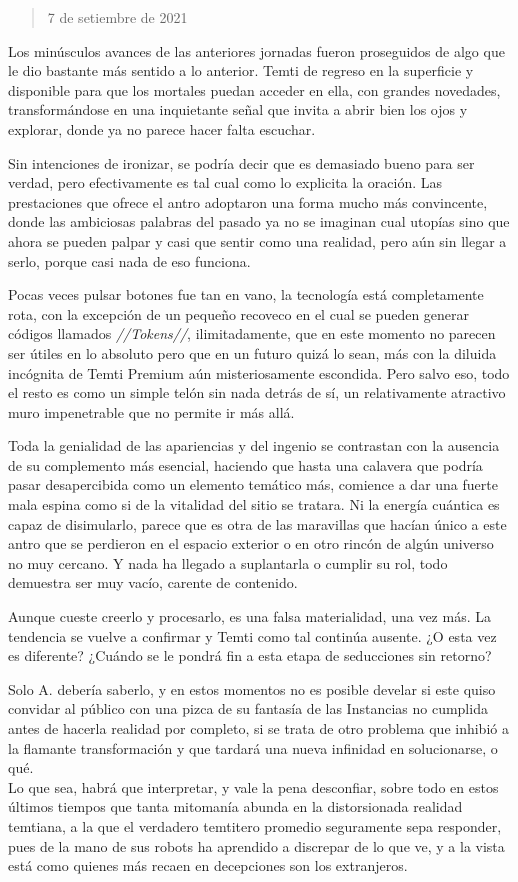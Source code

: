 \documentclass[
  spanish,
]{book}
\begin{document}
\begin{quote}
7 de setiembre de 2021
\end{quote}

Los minúsculos avances de las anteriores jornadas fueron proseguidos de algo que le dio bastante más sentido a lo anterior. Temti de regreso en la superficie y disponible para que los mortales puedan acceder en ella, con grandes novedades, transformándose en una inquietante señal que invita a abrir bien los ojos y explorar, donde ya no parece hacer falta escuchar.

Sin intenciones de ironizar, se podría decir que es demasiado bueno para ser verdad, pero efectivamente es tal cual como lo explicita la oración. Las prestaciones que ofrece el antro adoptaron una forma mucho más convincente, donde las ambiciosas palabras del pasado ya no se imaginan cual utopías sino que ahora se pueden palpar y casi que sentir como una realidad, pero aún sin llegar a serlo, porque casi nada de eso funciona.

Pocas veces pulsar botones fue tan en vano, la tecnología está completamente rota, con la excepción de un pequeño recoveco en el cual se pueden generar códigos llamados \emph{//Tokens//}, ilimitadamente, que en este momento no parecen ser útiles en lo absoluto pero que en un futuro quizá lo sean, más con la diluida incógnita de Temti Premium aún misteriosamente escondida. Pero salvo eso, todo el resto es como un simple telón sin nada detrás de sí, un relativamente atractivo muro impenetrable que no permite ir más allá.

Toda la genialidad de las apariencias y del ingenio se contrastan con la ausencia de su complemento más esencial, haciendo que hasta una calavera que podría pasar desapercibida como un elemento temático más, comience a dar una fuerte mala espina como si de la vitalidad del sitio se tratara. Ni la energía cuántica es capaz de disimularlo, parece que es otra de las maravillas que hacían único a este antro que se perdieron en el espacio exterior o en otro rincón de algún universo no muy cercano. Y nada ha llegado a suplantarla o cumplir su rol, todo demuestra ser muy vacío, carente de contenido.

Aunque cueste creerlo y procesarlo, es una falsa materialidad, una vez más. La tendencia se vuelve a confirmar y Temti como tal continúa ausente. ¿O esta vez es diferente? ¿Cuándo se le pondrá fin a esta etapa de seducciones sin retorno?

Solo A. debería saberlo, y en estos momentos no es posible develar si este quiso convidar al público con una pizca de su fantasía de las Instancias no cumplida antes de hacerla realidad por completo, si se trata de otro problema que inhibió a la flamante transformación y que tardará una nueva infinidad en solucionarse, o qué.\\
Lo que sea, habrá que interpretar, y vale la pena desconfiar, sobre todo en estos últimos tiempos que tanta mitomanía abunda en la distorsionada realidad temtiana, a la que el verdadero temtitero promedio seguramente sepa responder, pues de la mano de sus robots ha aprendido a discrepar de lo que ve, y a la vista está como quienes más recaen en decepciones son los extranjeros.
\end{document}
